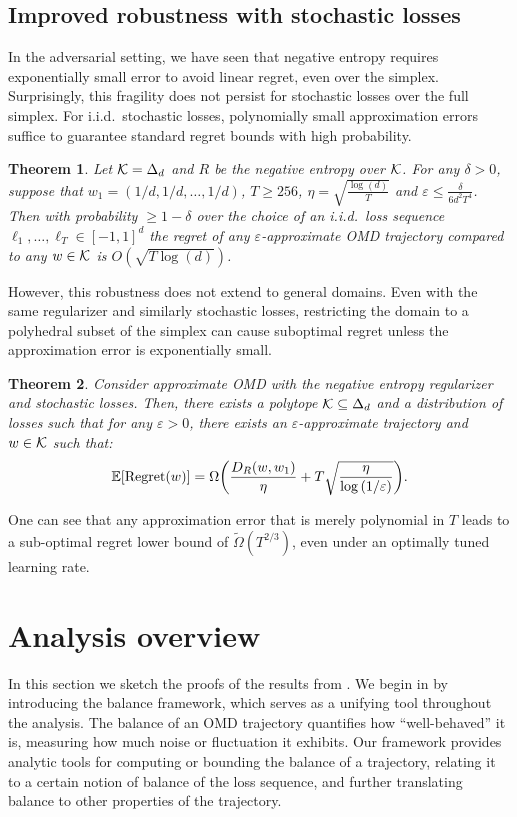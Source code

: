\documentclass[10pt]{article}
\newtheorem{theorem}{Theorem}
\theoremstyle{definition}
\theoremstyle{remark}
\renewcommand{\epsilon}{\varepsilon}
\newcommand\E{\mathbb{E}}
\newcommand{\roundy}[1]{ {\left( #1 \right)}}
\newcommand{\squary}[1]{ {\left[ #1 \right]}}
\newcommand{\reg}{{\rm Regret}}
\begin{document}
\subsection{Improved robustness with stochastic losses}\label{sec:stochastic}

In the adversarial setting, we have seen that negative entropy requires exponentially small error to avoid linear regret, even over the simplex. Surprisingly,
this fragility does not persist for stochastic losses over the full simplex. For i.i.d.~stochastic losses, polynomially small approximation errors suffice to guarantee standard regret bounds with high probability.


\begin{theorem}
\label{thm:ub_barrier_stochastic}
Let $\mathcal K=\Delta_d$ and $R$ be the negative entropy over $\mathcal K$. For any $\delta>0$, suppose that $w_1=(1/d,1/d,\dots,1/d)$, $T\ge 256$, $\eta = \sqrt{\frac{\log (d)}{T}}$ and $\epsilon \le \frac{\delta}{ 6 d^2 T^4}$.
Then with probability $\geq 1-\delta$ over the choice of an i.i.d.~loss sequence $\ell_1, \dots, \ell_T\in[-1,1]^d$ 
the regret of any \(\epsilon\)-approximate OMD trajectory compared to any $w \in \mathcal K$ is
$O(\sqrt{T\log(d)})$.
\end{theorem}

However, this robustness does not extend to general domains. Even with the same regularizer and similarly stochastic losses, restricting the domain to a polyhedral subset of the simplex can cause suboptimal regret unless the approximation error is exponentially small.

\begin{theorem}
\label{thm:lb_nonsimplex}
% 
Consider approximate OMD with the negative entropy regularizer and stochastic losses.
Then, there exists a polytope $\mathcal K \subseteq \Delta_d$ and a distribution of losses such that for any $\epsilon>0$, there exists an $\epsilon$-approximate trajectory and $w\in\mathcal K$ such that:
 \begin{align*}
     \E\squary{\reg(w)} = \Omega\roundy{\frac{D_R(w,w_1)}{\eta} +T\sqrt{\frac{\eta}{\log\roundy{1/\epsilon}}}}
     .
 \end{align*}
\end{theorem}

One can see that any approximation error that is merely polynomial in $T$ leads to a sub-optimal regret lower bound of \(\widetilde{\Omega}(T^{2/3})\), even under an optimally tuned learning rate.

\section{Analysis overview}\label{sec:sketches}
In this section we sketch the proofs of the results from . We begin in  by introducing the balance framework, which serves as a unifying tool throughout the analysis. The balance of an OMD trajectory quantifies how “well-behaved” it is, measuring how much noise or fluctuation it exhibits. Our framework provides analytic tools for computing or bounding the balance of a trajectory, relating it to a certain notion of balance of the loss sequence, and further translating balance to other properties of the trajectory.
\end{document}
